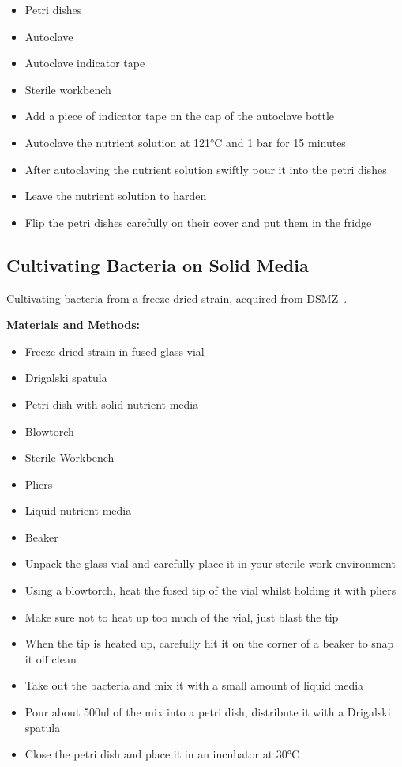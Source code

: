\begin{itemize}
    \item Petri dishes
    \item Autoclave
    \item Autoclave indicator tape
    \item Sterile workbench
    \item Add a piece of indicator tape on the cap of the autoclave bottle
    \item Autoclave the nutrient solution at 121°C and 1 bar for 15 minutes
    \item After autoclaving the nutrient solution swiftly pour it into the petri dishes
    \item Leave the nutrient solution to harden
    \item Flip the petri dishes carefully on their cover and put them in the fridge
\end{itemize}

\subsection{Cultivating Bacteria on Solid Media}

Cultivating bacteria from a freeze dried strain, acquired from DSMZ~\cite{dsmzbacteria}.

\textbf{Materials and Methods:}

\begin{itemize}
    \item Freeze dried strain in fused glass vial
    \item Drigalski spatula
    \item Petri dish with solid nutrient media
    \item Blowtorch
    \item Sterile Workbench
    \item Pliers
    \item Liquid nutrient media
    \item Beaker
    \item Unpack the glass vial and carefully place it in your sterile work environment
    \item Using a blowtorch, heat the fused tip of the vial whilst holding it with pliers
    \item Make sure not to heat up too much of the vial, just blast the tip
    \item When the tip is heated up, carefully hit it on the corner of a beaker to snap it
    off clean
    \item Take out the bacteria and mix it with a small amount of liquid media
    \item Pour about 500ul of the mix into a petri dish, distribute it with a Drigalski
    spatula
    \item Close the petri dish and place it in an incubator at 30°C
\end{itemize}

